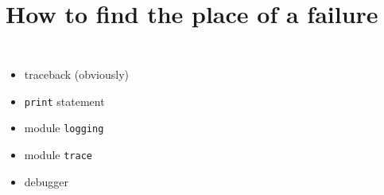 \documentclass[14pt,notes,svgnames]{beamer}
\begin{document}
\begingroup
    \section{How to find the place of a failure}
\endgroup

\begin{frame}
    \begin{columns}
        \begin{itemize}[<+->]
            \item<1,2,3,4,5> traceback (obviously)
            \item<2,3,4,5> \lstinline{print} statement
            \item<3,4,5> module \lstinline{logging}
            \item<4,5> module \lstinline{trace}
            \item<5> debugger
        \end{itemize}
        \centering
\end{columns}
\end{frame}
\end{document}
